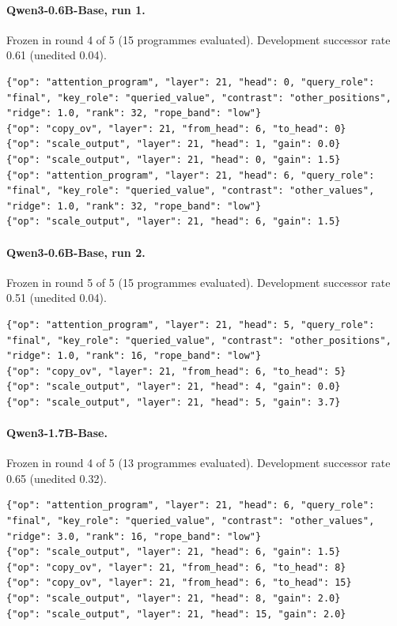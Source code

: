 \paragraph{Qwen3-0.6B-Base, run 1.} Frozen in round 4 of 5 (15 programmes evaluated). Development successor rate 0.61 (unedited 0.04).
\begin{Verbatim}[fontsize=\scriptsize,breaklines=true,breakanywhere=true]
{"op": "attention_program", "layer": 21, "head": 0, "query_role": "final", "key_role": "queried_value", "contrast": "other_positions", "ridge": 1.0, "rank": 32, "rope_band": "low"}
{"op": "copy_ov", "layer": 21, "from_head": 6, "to_head": 0}
{"op": "scale_output", "layer": 21, "head": 1, "gain": 0.0}
{"op": "scale_output", "layer": 21, "head": 0, "gain": 1.5}
{"op": "attention_program", "layer": 21, "head": 6, "query_role": "final", "key_role": "queried_value", "contrast": "other_values", "ridge": 1.0, "rank": 32, "rope_band": "low"}
{"op": "scale_output", "layer": 21, "head": 6, "gain": 1.5}
\end{Verbatim}
\paragraph{Qwen3-0.6B-Base, run 2.} Frozen in round 5 of 5 (15 programmes evaluated). Development successor rate 0.51 (unedited 0.04).
\begin{Verbatim}[fontsize=\scriptsize,breaklines=true,breakanywhere=true]
{"op": "attention_program", "layer": 21, "head": 5, "query_role": "final", "key_role": "queried_value", "contrast": "other_positions", "ridge": 1.0, "rank": 16, "rope_band": "low"}
{"op": "copy_ov", "layer": 21, "from_head": 6, "to_head": 5}
{"op": "scale_output", "layer": 21, "head": 4, "gain": 0.0}
{"op": "scale_output", "layer": 21, "head": 5, "gain": 3.7}
\end{Verbatim}
\paragraph{Qwen3-1.7B-Base.} Frozen in round 4 of 5 (13 programmes evaluated). Development successor rate 0.65 (unedited 0.32).
\begin{Verbatim}[fontsize=\scriptsize,breaklines=true,breakanywhere=true]
{"op": "attention_program", "layer": 21, "head": 6, "query_role": "final", "key_role": "queried_value", "contrast": "other_values", "ridge": 3.0, "rank": 16, "rope_band": "low"}
{"op": "scale_output", "layer": 21, "head": 6, "gain": 1.5}
{"op": "copy_ov", "layer": 21, "from_head": 6, "to_head": 8}
{"op": "copy_ov", "layer": 21, "from_head": 6, "to_head": 15}
{"op": "scale_output", "layer": 21, "head": 8, "gain": 2.0}
{"op": "scale_output", "layer": 21, "head": 15, "gain": 2.0}
\end{Verbatim}
